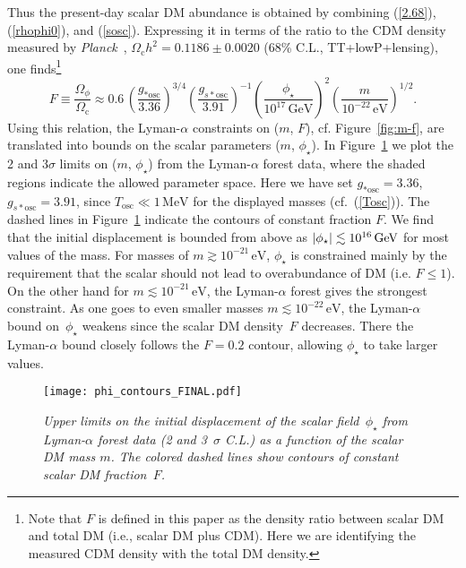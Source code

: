 \documentclass[11pt,nofootinbib]{article}
\numberwithin{equation}{section}
\begin{document}
Thus the present-day scalar DM abundance is obtained by combining (\ref{2.68}),
(\ref{rhophi0}), and (\ref{sosc}).
Expressing it in terms of the ratio to the CDM density measured by {\it
Planck}~\cite{Ade:2015xua}, 
$\Omega_{\mathrm{c}} h^2 = 0.1186 \pm 0.0020$
(68\% C.L., TT+lowP+lensing), one finds\footnote{Note that $F$ is
defined in this paper as the density ratio between scalar DM and total
DM (i.e., scalar DM plus CDM). Here we are identifying the measured CDM
density with the total DM density.}
\begin{equation}
 F \equiv \frac{\Omega_{\phi}}{\Omega_{\mathrm{c}}} \approx 0.6 \, 
  \left(\frac{g_{*\mathrm{osc}}}{3.36}\right)^{3/4}
  \left(\frac{g_{s*\mathrm{osc}}}{3.91}\right)^{-1}
  \left( \frac{\phi_{\star}}{10^{17} \, \mathrm{GeV}} \right)^2
   \left( \frac{m}{10^{-22} \, \mathrm{eV}} \right)^{1/2}.
\label{Omega_phi}
\end{equation}
%
Using this relation, the Lyman-$\alpha$ constraints on ($m$, $F$),
cf. Figure~\ref{fig:m-f}, are
translated into bounds on the scalar parameters ($m$, $\phi_\star$).
In Figure~\ref{fig:phi-f} we plot the 2 and 3$\sigma$ limits on ($m$,
$\phi_\star$) from the Lyman-$\alpha$ forest data, where the shaded regions
indicate the allowed parameter space. 
Here we have set $g_{*\mathrm{osc}} = 3.36$, $g_{s*\mathrm{osc}} = 3.91$, since
$T_{\mathrm{osc}} \ll 1 \, \mathrm{MeV}$ for the displayed masses
(cf.~(\ref{Tosc})). 
The dashed lines in  Figure~\ref{fig:phi-f} indicate the contours of constant fraction $F$.
We find that the initial displacement is bounded from above as
$\lvert\phi_\star\rvert \lesssim 10^{16}\, \mathrm{GeV}$ for most values of
the mass.
For masses of $m \gtrsim 10^{-21}\, \mathrm{eV}$,
$\phi_\star$ is constrained mainly by the requirement
that the scalar should not lead to overabundance of DM (i.e. $F
\leq 1$).
On the other hand for $m \lesssim
10^{-21}\, \mathrm{eV}$, the Lyman-$\alpha$ forest gives the strongest
constraint.
As one goes to even smaller masses $m \lesssim 10^{-22}\,
\mathrm{eV}$, the Lyman-$\alpha$ bound on~$\phi_\star$ weakens since the
scalar DM density~$F$ decreases. There the Lyman-$\alpha$ bound closely
follows the $F = 0.2$ contour, allowing $\phi_\star$ to take larger values.


\begin{figure}[t]
  \begin{center}
  \begin{center}
  \texttt{[image: phi\_contours\_FINAL.pdf]}
  \end{center}
   \caption{\emph{Upper limits on the initial displacement of the scalar
   field~$\phi_\star$ from Lyman-$\alpha$ forest data (2 and 3~$\sigma$
   C.L.) as a function of the scalar DM mass $m$.
   The colored dashed lines show contours of constant scalar DM fraction~$F$.}}
  \label{fig:phi-f}
  \end{center}
\end{figure}
\end{document}
